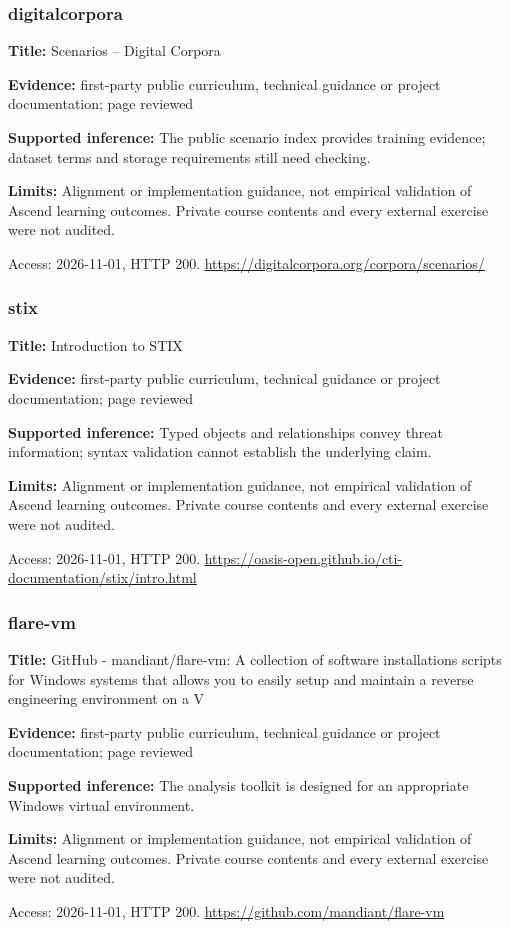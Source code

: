 \subsubsection{digitalcorpora}
\noindent\textbf{Title:} Scenarios – Digital Corpora\par
\noindent\textbf{Evidence:} first-party public curriculum, technical guidance or project documentation; page reviewed\par
\noindent\textbf{Supported inference:} The public scenario index provides training evidence; dataset terms and storage requirements still need checking.\par
\noindent\textbf{Limits:} Alignment or implementation guidance, not empirical validation of Ascend learning outcomes. Private course contents and every external exercise were not audited.\par
\noindent Access: 2026-11-01, HTTP 200. \url{https://digitalcorpora.org/corpora/scenarios/}
\subsubsection{stix}
\noindent\textbf{Title:} Introduction to STIX\par
\noindent\textbf{Evidence:} first-party public curriculum, technical guidance or project documentation; page reviewed\par
\noindent\textbf{Supported inference:} Typed objects and relationships convey threat information; syntax validation cannot establish the underlying claim.\par
\noindent\textbf{Limits:} Alignment or implementation guidance, not empirical validation of Ascend learning outcomes. Private course contents and every external exercise were not audited.\par
\noindent Access: 2026-11-01, HTTP 200. \url{https://oasis-open.github.io/cti-documentation/stix/intro.html}
\subsubsection{flare-vm}
\noindent\textbf{Title:} GitHub - mandiant/flare-vm: A collection of software installations scripts for Windows systems that allows you to easily setup and maintain a reverse engineering environment on a V\par
\noindent\textbf{Evidence:} first-party public curriculum, technical guidance or project documentation; page reviewed\par
\noindent\textbf{Supported inference:} The analysis toolkit is designed for an appropriate Windows virtual environment.\par
\noindent\textbf{Limits:} Alignment or implementation guidance, not empirical validation of Ascend learning outcomes. Private course contents and every external exercise were not audited.\par
\noindent Access: 2026-11-01, HTTP 200. \url{https://github.com/mandiant/flare-vm}
